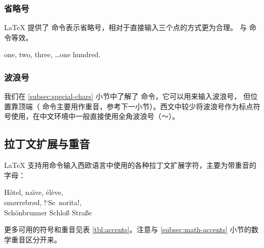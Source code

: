 \subsubsection{省略号}

\LaTeX{} 提供了  命令表示省略号，相对于直接输入三个点的方式更为合理。
 与  命令等效。
\begin{example}
one, two, three, \ldots one hundred.
\end{example}

\subsubsection{波浪号}

我们在 \ref{subsec:special-chars} 小节中了解了 \cmd{\textasciitilde} 命令，它可以用来输入波浪号，
但位置靠顶端（\cmd{\textasciitilde} 命令主要用作重音，参考下一小节）。西文中较少将波浪号作为标点符号使用，在中文环境中一般直接使用全角波浪号（～）。

\subsection{拉丁文扩展与重音}\label{subsec:accents}

\LaTeX{} 支持用命令输入西欧语言中使用的各种拉丁文扩展字符，主要为带重音的字母：
\begin{example}
H\^otel, na\"\i ve, \'el\`eve,\\
sm\o rrebr\o d, !`Se\ norita!,\\
Sch\"onbrunner Schlo\ss{}
Stra\ss e
\end{example}

更多可用的符号和重音见表 \ref{tbl:accents}。注意与 \ref{subsec:math-accents} 小节的数学重音区分开来。

